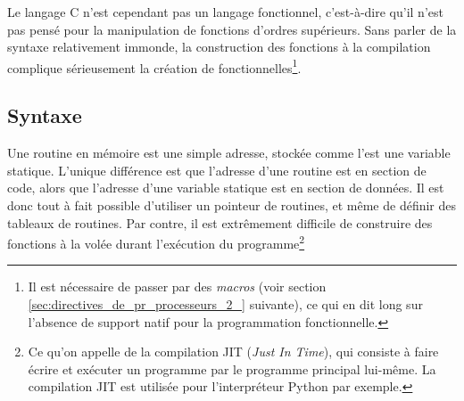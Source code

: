 \documentclass[../../../main.tex]{subfiles}
\begin{document}
Le langage C n'est cependant pas un langage fonctionnel, c'est-à-dire qu'il n'est pas pensé pour la manipulation de fonctions d'ordres supérieurs. Sans parler de la syntaxe relativement immonde, la construction des fonctions à la compilation complique sérieusement la création de fonctionnelles\footnote{Il est nécessaire de passer par des \textit{macros} (voir section \ref{sec:directives_de_pr_processeurs_2_} suivante), ce qui en dit long sur l'absence de support natif pour la programmation fonctionnelle.}.
\subsection{Syntaxe}
\label{sub:syntaxe_pointeurs_routines}
Une routine en mémoire est une simple adresse, stockée comme l'est une variable statique. L'unique différence est que l'adresse d'une routine est en section de code, alors que l'adresse d'une variable statique est en section de données. Il est donc tout à fait possible d'utiliser un pointeur de routines, et même de définir des tableaux de routines. Par contre, il est extrêmement difficile de construire des fonctions à la volée durant l'exécution du programme\footnote{Ce qu'on appelle de la compilation JIT (\textit{Just In Time}), qui consiste à faire écrire et exécuter un programme par le programme principal lui-même. La compilation JIT est utilisée pour l'interpréteur Python par exemple.}
\end{document}

